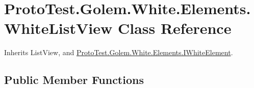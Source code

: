 \hypertarget{class_proto_test_1_1_golem_1_1_white_1_1_elements_1_1_white_list_view}{\section{Proto\-Test.\-Golem.\-White.\-Elements.\-White\-List\-View Class Reference}
\label{class_proto_test_1_1_golem_1_1_white_1_1_elements_1_1_white_list_view}
}


Inherits List\-View, and \hyperlink{interface_proto_test_1_1_golem_1_1_white_1_1_elements_1_1_i_white_element}{Proto\-Test.\-Golem.\-White.\-Elements.\-I\-White\-Element}.

\subsection*{Public Member Functions}
